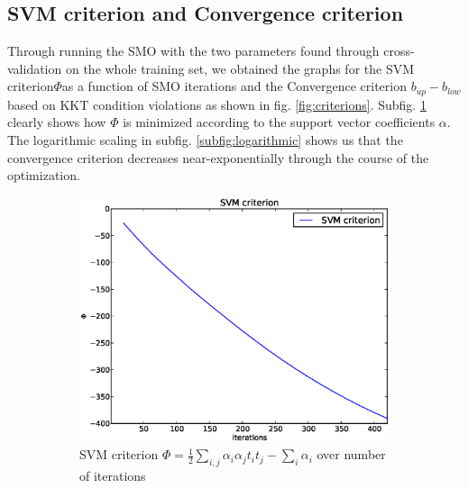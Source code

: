 \subsection{SVM criterion and Convergence criterion}
Through running the SMO with the two parameters found through cross-validation on the whole training set, we obtained the graphs for the SVM criterion\quad$\Phi$as a function of SMO iterations and the Convergence criterion $b_{up}-b_{low}$ based on KKT condition violations as shown in fig. \ref{fig:criterions}. Subfig. \ref{subfig:svm_criterion} clearly shows how $\Phi$ is minimized according to the support vector coefficients \textbf{$\alpha$}. The logarithmic scaling in subfig. \ref{subfig:logarithmic} shows us that the convergence criterion decreases near-exponentially through the course of the optimization.
\begin{figure}[!ht]
	\centering
	\begin{subfigure}[b]{.45\textwidth}
	\centering
	\includegraphics[width=\textwidth]{svm/svm_criterion.eps}
	\caption{SVM criterion $\Phi = \frac{1}{2}\sum_{i,j}\alpha_i\alpha_j t_i t_j -\sum_i \alpha_i$ over number of iterations}
	\label{subfig:svm_criterion}
	\end{subfigure}
	\quad
	\begin{subfigure}[b]{.45\textwidth}
	\centering

\end{subfigure}
\end{figure}
